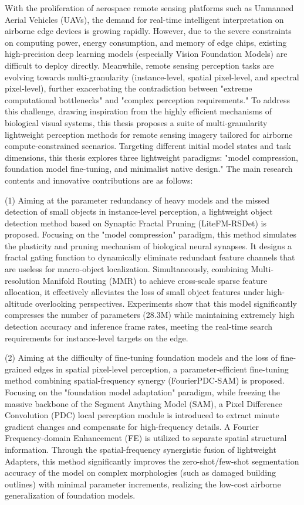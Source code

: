 \begin{eabstract}
With the proliferation of aerospace remote sensing platforms such as Unmanned Aerial Vehicles (UAVs), the demand for real-time intelligent interpretation on airborne edge devices is growing rapidly. However, due to the severe constraints on computing power, energy consumption, and memory of edge chips, existing high-precision deep learning models (especially Vision Foundation Models) are difficult to deploy directly. Meanwhile, remote sensing perception tasks are evolving towards multi-granularity (instance-level, spatial pixel-level, and spectral pixel-level), further exacerbating the contradiction between "extreme computational bottlenecks" and "complex perception requirements." To address this challenge, drawing inspiration from the highly efficient mechanisms of biological visual systems, this thesis proposes a suite of multi-granularity lightweight perception methods for remote sensing imagery tailored for airborne compute-constrained scenarios. Targeting different initial model states and task dimensions, this thesis explores three lightweight paradigms: "model compression, foundation model fine-tuning, and minimalist native design." The main research contents and innovative contributions are as follows:

(1) Aiming at the parameter redundancy of heavy models and the missed detection of small objects in instance-level perception, a lightweight object detection method based on Synaptic Fractal Pruning (LiteFM-RSDet) is proposed. Focusing on the "model compression" paradigm, this method simulates the plasticity and pruning mechanism of biological neural synapses. It designs a fractal gating function to dynamically eliminate redundant feature channels that are useless for macro-object localization. Simultaneously, combining Multi-resolution Manifold Routing (MMR) to achieve cross-scale sparse feature allocation, it effectively alleviates the loss of small object features under high-altitude overlooking perspectives. Experiments show that this model significantly compresses the number of parameters (28.3M) while maintaining extremely high detection accuracy and inference frame rates, meeting the real-time search requirements for instance-level targets on the edge.

(2) Aiming at the difficulty of fine-tuning foundation models and the loss of fine-grained edges in spatial pixel-level perception, a parameter-efficient fine-tuning method combining spatial-frequency synergy (FourierPDC-SAM) is proposed. Focusing on the "foundation model adaptation" paradigm, while freezing the massive backbone of the Segment Anything Model (SAM), a Pixel Difference Convolution (PDC) local perception module is introduced to extract minute gradient changes and compensate for high-frequency details. A Fourier Frequency-domain Enhancement (FE) is utilized to separate spatial structural information. Through the spatial-frequency synergistic fusion of lightweight Adapters, this method significantly improves the zero-shot/few-shot segmentation accuracy of the model on complex morphologies (such as damaged building outlines) with minimal parameter increments, realizing the low-cost airborne generalization of foundation models.


\end{eabstract}
